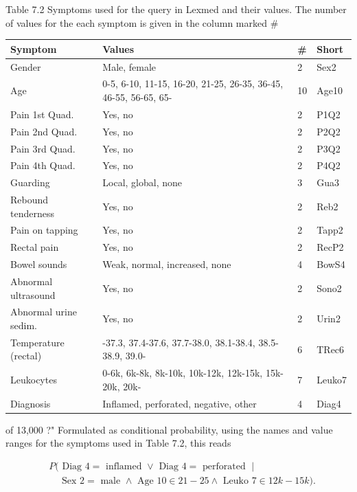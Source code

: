 \documentclass[10pt]{book}
\begin{document}
Table 7.2 Symptoms used for the query in Lexmed and their values. The number of values for the each symptom is given in the column marked \#
\begin{center}
\begin{tabular}{|l|l|l|l|}
\hline
Symptom & Values & \# & Short \\
\hline
Gender & Male, female & 2 & Sex2 \\
\hline
Age & 0-5, 6-10, 11-15, 16-20, 21-25, 26-35, 36-45, 46-55, 56-65, 65- & 10 & Age10 \\
\hline
Pain 1st Quad. & Yes, no & 2 & P1Q2 \\
\hline
Pain 2nd Quad. & Yes, no & 2 & P2Q2 \\
\hline
Pain 3rd Quad. & Yes, no & 2 & P3Q2 \\
\hline
Pain 4th Quad. & Yes, no & 2 & P4Q2 \\
\hline
Guarding & Local, global, none & 3 & Gua3 \\
\hline
Rebound tenderness & Yes, no & 2 & Reb2 \\
\hline
Pain on tapping & Yes, no & 2 & Tapp2 \\
\hline
Rectal pain & Yes, no & 2 & RecP2 \\
\hline
Bowel sounds & Weak, normal, increased, none & 4 & BowS4 \\
\hline
Abnormal ultrasound & Yes, no & 2 & Sono2 \\
\hline
Abnormal urine sedim. & Yes, no & 2 & Urin2 \\
\hline
Temperature (rectal) & -37.3, 37.4-37.6, 37.7-38.0, 38.1-38.4, 38.5-38.9, 39.0- & 6 & TRec6 \\
\hline
Leukocytes & 0-6k, 6k-8k, 8k-10k, 10k-12k, 12k-15k, 15k-20k, 20k- & 7 & Leuko7 \\
\hline
Diagnosis & Inflamed, perforated, negative, other & 4 & Diag4 \\
\hline
\end{tabular}
\end{center}

of 13,000 ?" Formulated as conditional probability, using the names and value ranges for the symptoms used in Table 7.2, this reads

$$
\begin{aligned}
& P(\text { Diag } 4=\text { inflamed } \vee \text { Diag } 4=\text { perforated } \mid \\
& \quad \text { Sex } 2=\text { male } \wedge \text { Age } 10 \in 21-25 \wedge \text { Leuko } 7 \in 12 k-15 k) .
\end{aligned}
$$
\end{document}
